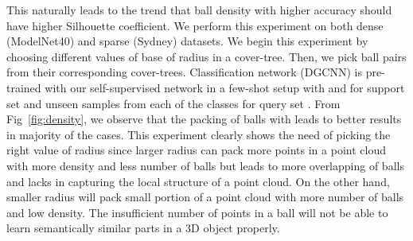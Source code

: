 \documentclass{article}
\begin{document}
 This naturally leads to the trend that ball density with higher accuracy should have higher Silhouette coefficient. We perform this experiment on both dense (ModelNet40) and sparse (Sydney) datasets. We begin this experiment by choosing different values of base  of radius in a cover-tree. Then, we pick ball pairs from their corresponding cover-trees. Classification network (DGCNN) is pre-trained with our self-supervised network in a few-shot setup with  and  for support set  and  unseen samples from each of the  classes for query set . From Fig~\ref{fig:density}, we observe that the packing of balls with  leads to better results in majority of the cases. This experiment clearly shows the need of picking the right value of radius since larger radius can pack more points in a point cloud with more density and less number of balls but leads to more overlapping of balls and lacks in capturing the local structure of a point cloud. On the other hand, smaller radius will pack small portion of a point cloud with more number of balls and low density. The insufficient number of points in a ball will not be able to learn  semantically similar parts in a 3D object properly.
\fi
\end{document}
